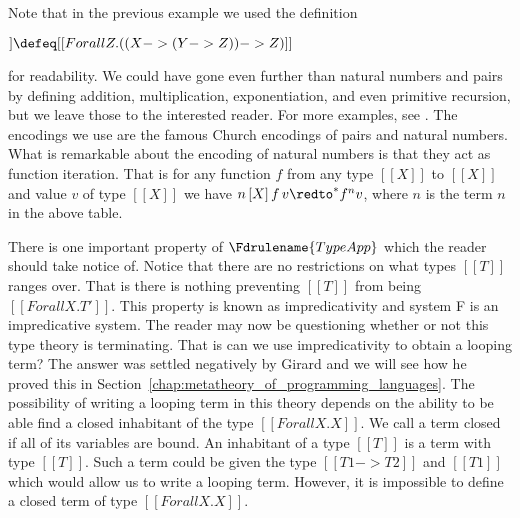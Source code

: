 Note that in the previous example we used the definition 
\begin{center}
  \begin{math}
    [[PAIRTY X Y]] \defeq [[Forall Z.((X -> (Y -> Z)) -> Z)]]
  \end{math}
\end{center}
for readability. We could have gone even further than natural numbers
and pairs by defining
addition, multiplication, exponentiation, and even primitive
recursion, but we leave those to the interested reader.  For more
examples, see \cite{Girard:1989}.  The encodings we use are the famous
Church encodings of pairs and natural numbers.  What is remarkable
about the encoding of natural numbers is that they act as function
iteration.  That is for any function $f$ from any type $[[X]]$ to
$[[X]]$ and value $v$ of type $[[X]]$ we have $n\,[X]\,f\,v \redto^* f^n
v$, where $n$ is the term $n$ in the above table.

There is one important property of $\Fdrulename{\normalsize TypeApp}$ which the
reader should take notice of.  Notice that there are no restrictions
on what types $[[T]]$ ranges over.  That is there is nothing
preventing $[[T]]$ from being $[[Forall X.T']]$.  This property is
known as impredicativity and system F is an impredicative system.  The
reader may now be questioning whether or not this type theory is
terminating.  That is can we use impredicativity to obtain a looping
term?  The answer was settled negatively by Girard and we will see how
he proved this in Section~\ref{chap:metatheory_of_programming_languages}.
The possibility of writing a looping term in this theory depends on the
ability to be able find a closed inhabitant of the type 
$[[Forall X.X]]$.  We call a term closed if all of its variables are bound.
An inhabitant of a type $[[T]]$ is a term with type $[[T]]$.  Such a
term could be given the type $[[T1 -> T2]]$ and $[[T1]]$ which would
allow us to write a looping term.  However, it is impossible to define
a closed term of type $[[Forall X.X]]$.

